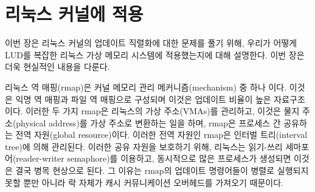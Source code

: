 \newpage
\section{리눅스 커널에 적용}
\label{sec:linux}



이번 장은 리눅스 커널의 업데이트 직렬화에 대한 문제를 풀기 위해,
우리가 어떻게 LUD를 복잡한 리눅스 가상 메모리 시스템에 적용했는지에 대해 설명한다.
이번 장은 더욱 현실적인 내용을 다룬다.

리눅스 역 매핑(rmap)은 커널 메모리 관리 메커니즘(mechanism) 중 하나 이다.
이것은 익명 역 매핑과 파일 역 매핑으로 구성되며 이것은 업데이트 비율이 높은 자료구조이다.
이러한 두 가지 rmap은 리눅스의 가상 주소(VMAs)를 관리하고, 이것은 물지 주소(physical address)를 
가상 주소로 변환하는 일을 하며, rmap은 프로세스 간 공유하는 전역 자원(global resource)이다.
이러한 전역 자원인 rmap은 인터벌 트리(interval tree)에 의해 관리된다.
이러한 공유 자원을 보호하기 위해, 리눅스는 읽기-쓰리 세마포어(reader-writer semaphore)를 이용하고, 
동시적으로 많은 프로세스가 생성되면 이것은 결국 병목 현상으로 된다. 
그 이유는 rmap의 업데이트 명령어들이 병렬로 실행되지 못할 뿐만 아니라 락 자체가 캐시
커뮤니케이션 오버헤드를 가져오기 때문이다.

